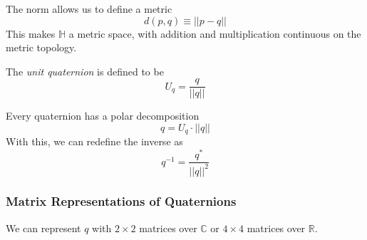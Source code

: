 \documentclass{article}
\begin{document}
    The norm allows us to define a metric 
    \begin{equation}
      d(p, q) \equiv ||p - q||
    \end{equation}
    This makes $\mathbb{H}$ a metric space, with addition and multiplication continuous on the metric topology. 

    \begin{definition}
      The \textit{unit quaternion} is defined to be
      \begin{equation}
        U_q = \frac{q}{||q||}
      \end{equation}
    \end{definition}

    \begin{corollary}
      Every quaternion has a polar decomposition
      \begin{equation}
        q = U_q \cdot ||q||
      \end{equation}
      With this, we can redefine the inverse as
      \begin{equation}
        q^{-1} = \frac{q^*}{||q||^2}
      \end{equation}
    \end{corollary}

    \subsubsection{Matrix Representations of Quaternions}

      We can represent $q$ with $2 \times 2$ matrices over $\mathbb{C}$ or $4\times 4 $ matrices over $\mathbb{R}$. 
\end{document}
